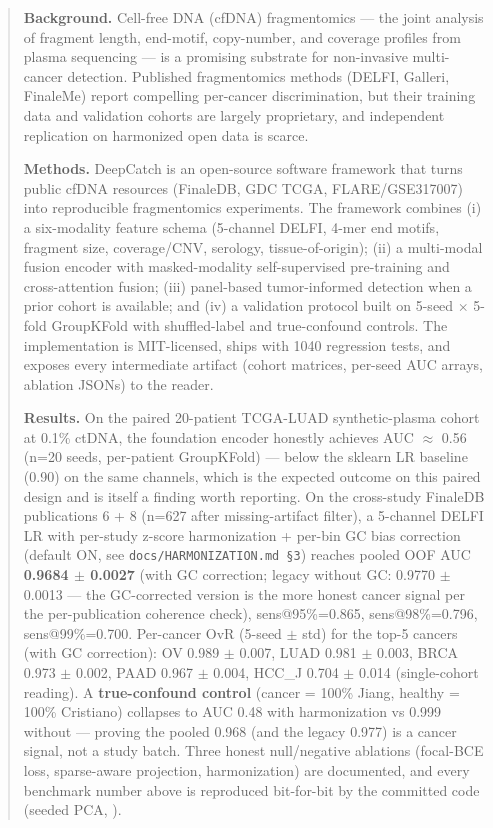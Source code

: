 \documentclass[11pt]{article}
\begin{document}
\begin{abstract}
\textbf{Background.} Cell-free DNA (cfDNA) fragmentomics --- the joint analysis of fragment length, end-motif, copy-number, and coverage profiles from plasma sequencing --- is a promising substrate for non-invasive multi-cancer detection. Published fragmentomics methods (DELFI, Galleri, FinaleMe) report compelling per-cancer discrimination, but their training data and validation cohorts are largely proprietary, and independent replication on harmonized open data is scarce.

\textbf{Methods.} DeepCatch is an open-source software framework that turns public cfDNA resources (FinaleDB, GDC TCGA, FLARE/GSE317007) into reproducible fragmentomics experiments. The framework combines (i) a six-modality feature schema (5-channel DELFI, 4-mer end motifs, fragment size, coverage/CNV, serology, tissue-of-origin); (ii) a multi-modal fusion encoder with masked-modality self-supervised pre-training and cross-attention fusion; (iii) panel-based tumor-informed detection when a prior cohort is available; and (iv) a validation protocol built on 5-seed $\times$ 5-fold GroupKFold with shuffled-label and true-confound controls. The implementation is MIT-licensed, ships with 1040 regression tests, and exposes every intermediate artifact (cohort matrices, per-seed AUC arrays, ablation JSONs) to the reader.

\textbf{Results.} On the paired 20-patient TCGA-LUAD synthetic-plasma cohort at 0.1\% ctDNA, the foundation encoder honestly achieves AUC $\approx$ 0.56 (n=\allowbreak{}20 seeds, per-patient GroupKFold) --- below the sklearn LR baseline (0.90) on the same channels, which is the expected outcome on this paired design and is itself a finding worth reporting. On the cross-study FinaleDB publications 6 + 8 (n=\allowbreak{}627 after missing-artifact filter), a 5-channel DELFI LR with per-study z-score harmonization + per-bin GC bias correction (default ON, see \texttt{docs/\allowbreak{}HARMONIZATION.md \S{}3}) reaches pooled OOF AUC \textbf{0.9684 $\pm$ 0.0027} (with GC correction; legacy without GC: 0.9770 $\pm$ 0.0013 --- the GC-corrected version is the more honest cancer signal per the per-publication coherence check), sens@95\%=\allowbreak{}0.865, sens@98\%=\allowbreak{}0.796, sens@99\%=\allowbreak{}0.700. Per-cancer OvR (5-seed $\pm$ std) for the top-5 cancers (with GC correction): OV 0.989 $\pm$ 0.007, LUAD 0.981 $\pm$ 0.003, BRCA 0.973 $\pm$ 0.002, PAAD 0.967 $\pm$ 0.004, HCC\_J 0.704 $\pm$ 0.014 (single-cohort reading). A \textbf{true-confound control} (cancer =\allowbreak{} 100\% Jiang, healthy =\allowbreak{} 100\% Cristiano) collapses to AUC 0.48 with harmonization vs 0.999 without --- proving the pooled 0.968 (and the legacy 0.977) is a cancer signal, not a study batch. Three honest null/negative ablations (focal-BCE loss, sparse-aware projection, harmonization) are documented, and every benchmark number above is reproduced bit-for-bit by the committed code (seeded PCA, ).


\end{abstract}
\end{document}

